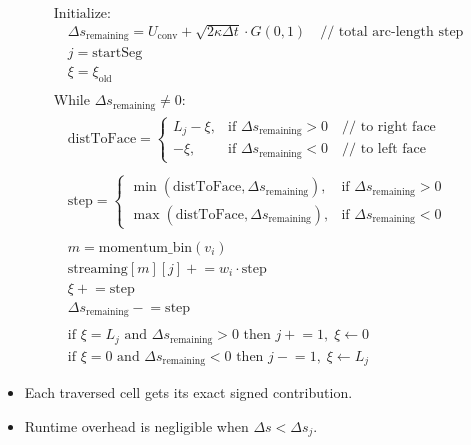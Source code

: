 \[
\begin{aligned}
&\text{Initialize:} \\
&\quad \Delta s_{\text{remaining}} = U_{\text{conv}} + \sqrt{2 \kappa \Delta t} \cdot G(0,1) \quad \text{// total arc-length step} \\
&\quad j = \text{startSeg} \\
&\quad \xi = \xi_{\text{old}} \\
\\
&\text{While } \Delta s_{\text{remaining}} \ne 0: \\
&\quad \text{distToFace} =
  \begin{cases}
    L_j - \xi, & \text{if } \Delta s_{\text{remaining}} > 0 \quad \text{// to right face} \\
    -\xi, & \text{if } \Delta s_{\text{remaining}} < 0 \quad \text{// to left face}
  \end{cases} \\
\\
&\quad \text{step} =
  \begin{cases}
    \min(\text{distToFace}, \Delta s_{\text{remaining}}), & \text{if } \Delta s_{\text{remaining}} > 0 \\
    \max(\text{distToFace}, \Delta s_{\text{remaining}}), & \text{if } \Delta s_{\text{remaining}} < 0
  \end{cases} \\
\\
&\quad m = \text{momentum\_bin}(v_i) \\
&\quad \text{streaming}[m][j] \mathrel{+}= w_i \cdot \text{step} \\
&\quad \xi \mathrel{+}= \text{step} \\
&\quad \Delta s_{\text{remaining}} \mathrel{-}= \text{step} \\
\\
&\quad \text{if } \xi = L_j \text{ and } \Delta s_{\text{remaining}} > 0 \text{ then } j \mathrel{+}= 1,\; \xi \leftarrow 0 \\
&\quad \text{if } \xi = 0 \text{ and } \Delta s_{\text{remaining}} < 0 \text{ then } j \mathrel{-}= 1,\; \xi \leftarrow L_j
\end{aligned}
\]


\begin{itemize}
  \item Each traversed cell gets its exact signed contribution.
  \item Runtime overhead is negligible when $\Delta s < \Delta s_j$.
\end{itemize}

